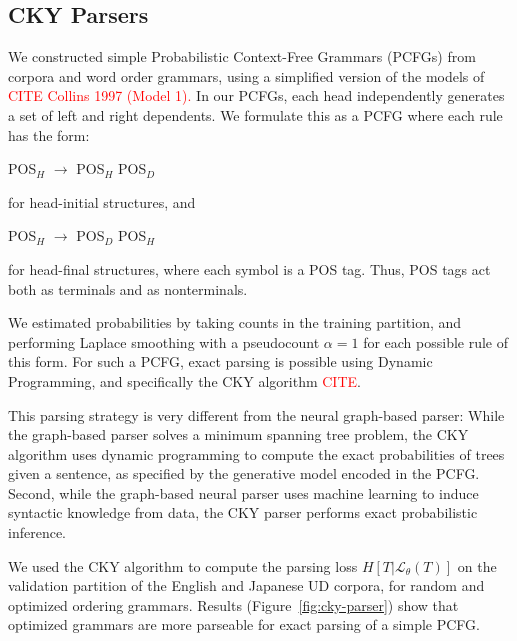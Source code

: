 \documentclass[10pt,twoside,lineno]{article}
\begin{document}
\subsection{CKY Parsers}


We constructed simple Probabilistic Context-Free Grammars (PCFGs) from corpora and word order grammars, using a simplified version of the models of \textcolor{red}{CITE Collins 1997 (Model 1).}
In our PCFGs, each head independently generates a set of left and right dependents.
We formulate this as a PCFG where each rule has the form:
\begin{center}
	POS$_H$ $\rightarrow$ POS$_H$ POS$_D$
\end{center}
for head-initial structures, and
\begin{center}
	POS$_H$ $\rightarrow$ POS$_D$ POS$_H$
\end{center}
for head-final structures, where each symbol is a POS tag.
Thus, POS tags act both as terminals and as nonterminals.

We estimated probabilities by taking counts in the training partition, and performing Laplace smoothing with a pseudocount $\alpha=1$ for each possible rule of this form.
For such a PCFG, exact parsing is possible using Dynamic Programming, and specifically the CKY algorithm \textcolor{red}{CITE}.

This parsing strategy is very different from the neural graph-based parser:
While the graph-based parser solves a minimum spanning tree problem, the CKY algorithm uses dynamic programming to compute the exact probabilities of trees given a sentence, as specified by the generative model encoded in the PCFG.
Second, while the graph-based neural parser uses machine learning to induce syntactic knowledge from data, the CKY parser performs exact probabilistic inference.

We used the CKY algorithm to compute the parsing loss $H[T|\mathcal{L}_\theta(T)]$ on the validation partition of the English and Japanese UD corpora, for random and optimized ordering grammars.
Results (Figure~\ref{fig:cky-parser}) show that optimized grammars are more parseable for exact parsing of a simple PCFG.
\end{document}
